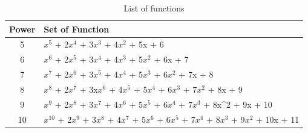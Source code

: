 \documentclass[runningheads,a4paper]{llncs}
\begin{document}
\begin{table}[]
	\centering
	\caption{List of functions}
	\label{listFunc}
	\begin{tabular}{c|l}
		\hline
		\hline
		Power & Set of Function                                                                                                                                                                                                                  \\ \hline
		
		5     & $x^{5}$ + 2$x^{4}$ + 3$x^{3}$ + 4$x^{2}$ + 5x + 6                                                                                                                            \\ 
		6     & $x^{6}$ + 2$x^{5}$ + 3$x^{4}$ + 4$x^{3}$ + 5$x^{2}$ + 6x + 7                                                                                                    \\ 
		7     & $x^{7}$ + 2$x^{6}$ + 3$x^{5}$ + 4$x^{4}$ + 5$x^{3}$ + 6$x^{2}$ + 7x + 8                                                                            \\ 
		8     & $x^{8}$ + 2$x^{7}$ + 3x$x^{6}$ + 4$x^{5}$ + 5$x^{4}$ + 6$x^{3}$ + 7$x^{2}$ + 8x + 9                                                    \\ 
		9     & $x^{9}$ + 2$x^{8}$ + 3$x^{7}$ + 4$x^{6}$ + 5$x^{5}$ + 6$x^{4}$ + 7$x^{3}$ + 8x\textasciicircum{}2 + 9x + 10                           \\ 
		10    & $x^{10}$ + 2$x^{9}$ + 3$x^{8}$ + 4$x^{7}$ + 5$x^{6}$ + 6$x^{5}$ + 7$x^{4}$ + 8$x^{3}$ + 9$x^{2}$ + 10x + 11 \\ \hline \hline
	\end{tabular}
\end{table}
\end{document}
